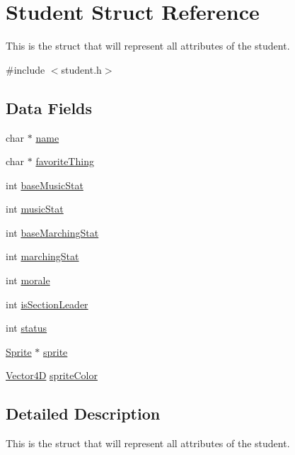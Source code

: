 \hypertarget{struct_student}{}\section{Student Struct Reference}
\label{struct_student}


This is the struct that will represent all attributes of the student.  




{\ttfamily \#include $<$student.\+h$>$}

\subsection*{Data Fields}
\begin{DoxyCompactItemize}
\item 
char $\ast$ \hyperlink{struct_student_a5ac083a645d964373f022d03df4849c8}{name}
\item 
char $\ast$ \hyperlink{struct_student_afc5b1d340c71c05b606b922a2b771cf2}{favorite\+Thing}
\item 
int \hyperlink{struct_student_a961dda4935fec71b930a5e890dfd800f}{base\+Music\+Stat}
\item 
int \hyperlink{struct_student_a537b274a8e0eb482207a27efdbcdbee5}{music\+Stat}
\item 
int \hyperlink{struct_student_af4ba11ccfbd6c945ffd3a0982d7c5d03}{base\+Marching\+Stat}
\item 
int \hyperlink{struct_student_a1ffd9807649f3fadb5087c20438e9029}{marching\+Stat}
\item 
int \hyperlink{struct_student_a41618f2cce097ee241597cae9276e1ec}{morale}
\item 
int \hyperlink{struct_student_ac6afbba8552fa564e1dffd48731b7741}{is\+Section\+Leader}
\item 
int \hyperlink{struct_student_a6e27f49150e9a14580fb313cc2777e00}{status}
\item 
\hyperlink{gf2d__sprite_8h_a85b5a622f08c587d1f33fd504a24416e}{Sprite} $\ast$ \hyperlink{struct_student_a7c54302f990f134ca6e37a2e9ef9999d}{sprite}
\item 
\hyperlink{struct_vector4_d}{Vector4D} \hyperlink{struct_student_a34baf45a25100899cd17d061048d0ce5}{sprite\+Color}
\end{DoxyCompactItemize}


\subsection{Detailed Description}
This is the struct that will represent all attributes of the student. 

